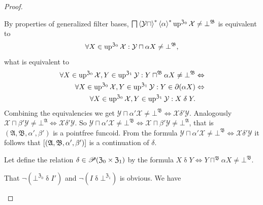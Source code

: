 \begin{proof}
\begin{widedisorder}
By properties of generalized filter bases, $\bigsqcap\left\langle \mathcal{Y}\sqcap\right\rangle ^{\ast}\left\langle \alpha\right\rangle ^{\ast}\operatorname{up}^{\mathfrak{Z}_{0}}\mathcal{X}\ne\bot^{\mathfrak{B}}$
is equivalent to
\[
\forall X\in\operatorname{up}^{\mathfrak{Z}_{0}}\mathcal{X}:\mathcal{Y}\sqcap\alpha X\ne\bot^{\mathfrak{B}},
\]
what is equivalent to
\begin{align*}
\forall X\in\operatorname{up}^{\mathfrak{Z}_{0}}\mathcal{X},Y\in\operatorname{up}^{\mathfrak{Z}_{1}}\mathcal{Y}:Y\sqcap^{\mathfrak{B}}\alpha X\ne\bot^{\mathfrak{B}} & \Leftrightarrow\\
\forall X\in\operatorname{up}^{\mathfrak{Z}_{0}}\mathcal{X},Y\in\operatorname{up}^{\mathfrak{Z}_{1}}\mathcal{Y}:Y\in\partial(\alpha X) & \Leftrightarrow\\
\forall X\in\operatorname{up}^{\mathfrak{Z}_{0}}\mathcal{X},Y\in\operatorname{up}^{\mathfrak{Z}_{1}}\mathcal{Y}:X\mathrel\delta Y.
\end{align*}
Combining the equivalencies we get $\mathcal{Y}\sqcap\alpha'\mathcal{X}\ne\bot^{\mathfrak{B}}\Leftrightarrow\mathcal{X}\mathrel{\delta'}\mathcal{Y}$.
Analogously $\mathcal{X}\sqcap\beta'\mathcal{Y}\ne\bot^{\mathfrak{A}}\Leftrightarrow\mathcal{X}\mathrel{\delta'}\mathcal{Y}$.
So $\mathcal{Y}\sqcap\alpha'\mathcal{X}\ne\bot^{\mathfrak{B}}\Leftrightarrow\mathcal{X}\sqcap\beta'\mathcal{Y}\ne\bot^{\mathfrak{A}}$,
that is $(\mathfrak{A},\mathfrak{B},\alpha',\beta')$ is a pointfree
funcoid. From the formula $\mathcal{Y}\sqcap\alpha'\mathcal{X}\ne\bot^{\mathfrak{B}}\Leftrightarrow\mathcal{X}\mathrel{\delta'}\mathcal{Y}$
it follows that $\mathrel{\left[(\mathfrak{A},\mathfrak{B},\alpha',\beta')\right]}$
is a continuation of $\delta$.

\item [{\ref{pf-cont-f}}] Let define the relation $\delta\in\mathscr{P}(\mathfrak{Z}_{0}\times\mathfrak{Z}_{1})$
by the formula $X\mathrel{\delta}Y\Leftrightarrow Y\sqcap^{\mathfrak{B}}\alpha X\neq\bot^{\mathfrak{B}}$.


That $\neg(\bot^{\mathfrak{Z}_{0}}\mathrel{\delta}I')$ and $\neg(I\mathrel{\delta}\bot^{\mathfrak{Z}_{1}})$
is obvious. We have



\end{widedisorder}
\end{proof}
